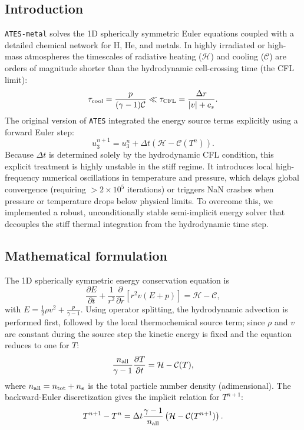 \documentclass[english,a4paper]{kiseon_memo}
\begin{document}
\subsection{Introduction}
\texttt{ATES-metal} solves the 1D spherically symmetric Euler equations coupled
with a detailed chemical network for H, He, and metals. In highly irradiated or
high-mass atmospheres the timescales of radiative heating ($\mathcal{H}$) and
cooling ($\mathcal{C}$) are orders of magnitude shorter than the hydrodynamic
cell-crossing time (the CFL limit):
\begin{equation}
  \tau_{\rm cool} = \frac{p}{(\gamma - 1)\mathcal{C}} \ll \tau_{\rm CFL} = \frac{\Delta r}{|v| + c_s}.
\end{equation}
The original version of \texttt{ATES} integrated the energy source terms explicitly
using a forward Euler step:
\begin{equation}
  u^{n+1}_3 = u^n_3 + \Delta t \left( \mathcal{H} - \mathcal{C}(T^n) \right).
\end{equation}
Because $\Delta t$ is determined solely by the hydrodynamic CFL condition, this
explicit treatment is highly unstable in the stiff regime. It introduces local
high-frequency numerical oscillations in temperature and pressure, which delays
global convergence (requiring $>2\times 10^5$ iterations) or triggers NaN crashes
when pressure or temperature drops below physical limits. To overcome this, we
implemented a robust, unconditionally stable semi-implicit energy solver that
decouples the stiff thermal integration from the hydrodynamic time step.

\subsection{Mathematical formulation}
The 1D spherically symmetric energy conservation equation is
\begin{equation}
  \frac{\partial E}{\partial t} + \frac{1}{r^2} \frac{\partial}{\partial r} \left[ r^2 v (E + p) \right] = \mathcal{H} - \mathcal{C},
\end{equation}
with $E = \frac{1}{2}\rho v^2 + \frac{p}{\gamma-1}$. Using operator splitting, the
hydrodynamic advection is performed first, followed by the local thermochemical
source term; since $\rho$ and $v$ are constant during the source step the kinetic
energy is fixed and the equation reduces to one for $T$:
\begin{equation}
  \frac{n_{\rm all}}{\gamma - 1} \frac{\partial T}{\partial t} = \mathcal{H} - \mathcal{C}(T),
\end{equation}
where $n_{\rm all} = n_{\rm tot} + n_e$ is the total particle number density
(adimensional). The backward-Euler discretization gives the implicit relation for
$T^{n+1}$:
\begin{equation}
  T^{n+1} - T^n = \Delta t \frac{\gamma - 1}{n_{\rm all}} \left( \mathcal{H} - \mathcal{C}(T^{n+1}) \right).
\end{equation}
\end{document}
